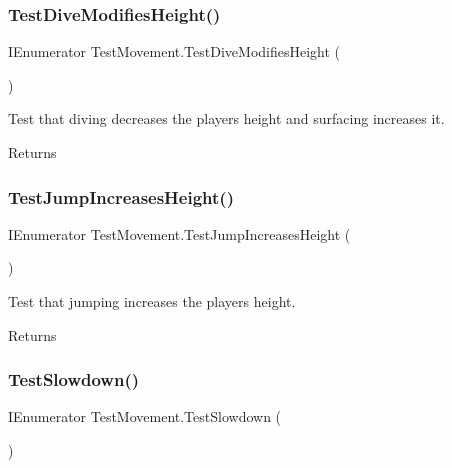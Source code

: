 \subsubsection{\texorpdfstring{Test\+Dive\+Modifies\+Height()}{TestDiveModifiesHeight()}}
{\footnotesize\ttfamily I\+Enumerator Test\+Movement.\+Test\+Dive\+Modifies\+Height (\begin{DoxyParamCaption}{ }\end{DoxyParamCaption})}



Test that diving decreases the player\textquotesingle{}s height and surfacing increases it. 

\begin{DoxyReturn}{Returns}

\end{DoxyReturn}
\mbox{\label{class_test_movement_a235b8457a9c92a20b0af8832e8e2e8cf}} 
\subsubsection{\texorpdfstring{Test\+Jump\+Increases\+Height()}{TestJumpIncreasesHeight()}}
{\footnotesize\ttfamily I\+Enumerator Test\+Movement.\+Test\+Jump\+Increases\+Height (\begin{DoxyParamCaption}{ }\end{DoxyParamCaption})}



Test that jumping increases the player\textquotesingle{}s height. 

\begin{DoxyReturn}{Returns}

\end{DoxyReturn}
\mbox{\label{class_test_movement_af1ce0ac38691919ebda49bfa1b6713c9}} 
\subsubsection{\texorpdfstring{Test\+Slowdown()}{TestSlowdown()}}
{\footnotesize\ttfamily I\+Enumerator Test\+Movement.\+Test\+Slowdown (\begin{DoxyParamCaption}{ }\end{DoxyParamCaption})}



